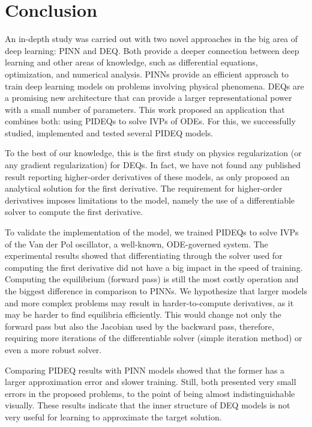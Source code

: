 \chapter{Conclusion}\label{ch:conclusion}

An in-depth study was carried out with two novel approaches in the big area of deep learning: \gls{PINN} and {DEQ}.
Both provide a deeper connection between deep learning and other areas of knowledge, such as differential equations, optimization, and numerical analysis.
\gls{PINN}s provide an efficient approach to train deep learning models on problems involving physical phenomena.
\gls{DEQ}s are a promising new architecture that can provide a larger representational power with a small number of parameters.
This work proposed an application that combines both: using \gls{PIDEQ}s to solve \gls{IVP}s of \gls{ODE}s.
For this, we successfully studied, implemented and tested several \gls{PIDEQ} models.

To the best of our knowledge, this is the first study on physics regularization (or any gradient regularization) for \gls{DEQ}s.
In fact, we have not found any published result reporting higher-order derivatives of these models, as \textcite{Bai2019} only proposed an analytical solution for the first derivative.
The requirement for higher-order derivatives imposes limitations to the model, namely the use of a differentiable solver to compute the first derivative.

To validate the implementation of the model, we trained \gls{PIDEQ}s to solve \gls{IVP}s of the Van der Pol oscillator, a well-known, \gls{ODE}-governed system.
The experimental results showed that differentiating through the solver used for computing the first derivative did not have a big impact in the speed of training.
Computing the equilibrium (forward pass) is still the most costly operation and the biggest difference in comparison to \gls{PINN}s.
We hypothesize that larger models and more complex problems may result in harder-to-compute derivatives, as it may be harder to find equilibria efficiently.
This would change not only the forward pass but also the Jacobian used by the backward pass, therefore, requiring more iterations of the differentiable solver (simple iteration method) or even a more robust solver.

Comparing \gls{PIDEQ} results with \gls{PINN} models showed that the former has a larger approximation error and slower training.
Still, both presented very small errors in the proposed problems, to the point of being almost indistinguishable visually.
These results indicate that the inner structure of \gls{DEQ} models is not very useful for learning to approximate the target solution.

